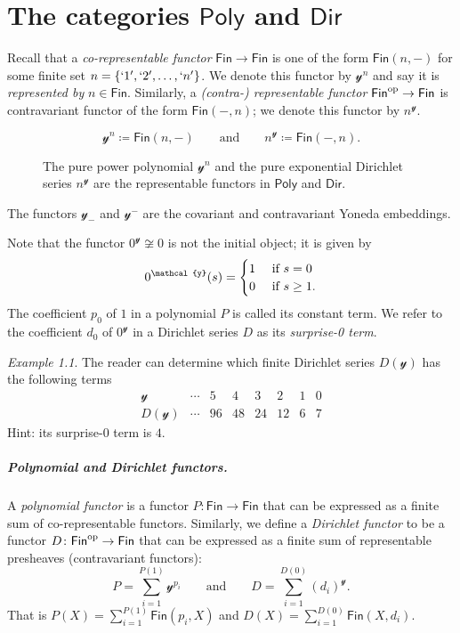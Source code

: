 \documentclass[11pt, article, one side]{memoir}
\theoremstyle{theorem}
\theoremstyle{definition}
\theoremstyle{remark}
\newtheorem{example}[equation]{Example}
\newcommand{\Cat}[1]{\mathsf{#1}}%
\newcommand{\op}{^\tn{op}}
\newcommand{\tn}[1]{\textnormal{#1}}
\newcommand{\finset}{\Cat{Fin}}
\newcommand{\yon}{\mathcal{y}}
\newcommand{\poly}{\Cat{Poly}}
\newcommand{\dir}{\Cat{Dir}}
\newcommand{\qqand}{\qquad\text{and}\qquad}
\begin{document}
\chapter{The categories $\poly$ and $\dir$}
Recall that a \emph{co-representable functor} $\finset\to\finset$ is one of the form $\finset(n, -)$ for some finite set $n=\{`1', `2',\ldots,`n'\}$. We denote this functor by $\yon^n$ and say it is \emph{represented by} $n\in\finset$. Similarly, a \emph{(contra-) representable functor} $\finset\op\to\finset$ is contravariant functor of the form $\finset(-,n)$; we denote this functor by $n^\yon$.
\begin{figure}
\[
  \yon^n \coloneqq \finset(n,-)
  \qqand
  n^\yon\coloneqq\finset(-,n).
\]
  \caption{The pure power polynomial $\yon^n$ and the pure exponential Dirichlet series $n^\yon$ are the representable functors in $\poly$ and $\dir$.}
\end{figure}
The functors $\yon_-$ and $\yon^-$ are the covariant and contravariant Yoneda embeddings.

Note that the functor $0^\yon\not\cong 0$ is not the initial object; it is given by
\[
0^\yon(s)=
\begin{cases}
1&\tn{ if } s=0\\
0&\tn{ if } s\geq1.
\end{cases}
\]
The coefficient $p_0$ of $1$ in a polynomial $P$ is called its constant term. We refer to the coefficient $d_0$ of $0^\yon$ in a Dirichlet series $D$ as its \emph{surprise-0 term}.

\begin{example}
The reader can determine which finite Dirichlet series $D(\yon)$ has the following terms
\[
\begin{array}{c|ccccccc}
\yon&
\cdots&
5&
4&
3&
2&
1&
0
\\\hline
D(\yon)&
\cdots&
96&
48&
24&
12&
6&
7
\end{array}
\]
Hint: its surprise-0 term is $4$.
\end{example}

\paragraph{Polynomial and Dirichlet functors.}
A \emph{polynomial functor} \cite{GambinoKock} is a functor $P\colon\finset\to\finset$ that can be expressed as a finite sum of co-representable functors. Similarly, we define a \emph{Dirichlet functor} to be a functor $D\colon\finset\op\to\finset$ that can be expressed as a finite sum of representable presheaves (contravariant functors):
\begin{equation}\label{eqn.finite_sum}
  P=\sum_{i=1}^{P(1)}\yon^{p_i}
  \qqand
  D=\sum_{i=1}^{D(0)}(d_i)^\yon.
\end{equation}
That is $P(X)=\sum_{i=1}^{P(1)}\finset(p_i,X)$ and $D(X)=\sum_{i=1}^{D(0)}\finset(X,d_i)$.
\end{document}
